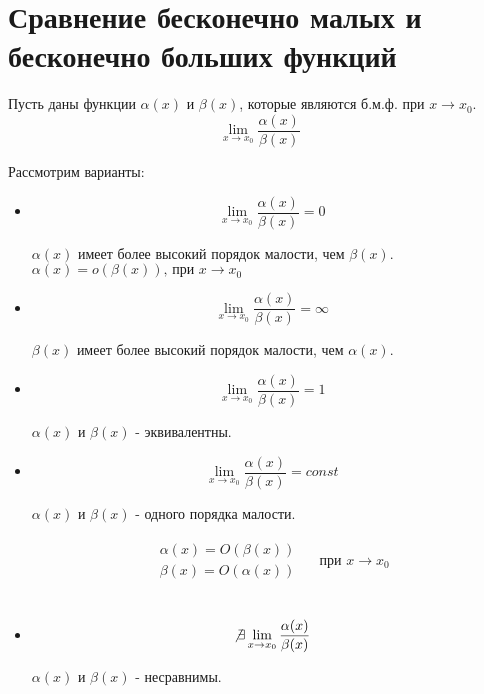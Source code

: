 \section{Сравнение бесконечно малых и бесконечно больших функций}

Пусть даны функции $\alpha(x)$ и $\beta(x)$, которые являются б.м.ф. при $x \to x_0$. \[
  \lim_{x \to x_0} \frac{\alpha(x)}{\beta(x)}
\]

Рассмотрим варианты:

\begin{itemize}

  \item \[
      \lim_{x \to x_0} \frac{\alpha(x)}{\beta(x)} = 0
  \] 
  \begin{center}
    $\alpha(x)$ имеет более высокий порядок малости, чем $\beta(x)$. \\
    $\boxed{\alpha(x) = o(\beta(x)) \text{, при } x \to x_0}$
  \end{center} 
  
  \item \[
  \lim_{x \to x_0} \frac{\alpha(x)}{\beta(x)} = \infty
  \]
  \begin{center}
    $\beta(x)$ имеет более высокий порядок малости, чем $\alpha(x)$. \\
  \end{center} 

  \item \[
    \lim_{x \to x_0} \frac{\alpha(x)}{\beta(x)} = 1
  \] 
  \begin{center}
    $\alpha(x)$ и $\beta(x)$ - эквивалентны. \\
  \end{center}

  \item \[
    \lim_{x \to x_0} \frac{\alpha(x)}{\beta(x)} = const
  \] 
  \begin{center}
    $\alpha(x)$ и $\beta(x)$ - одного порядка малости.
  \end{center}
  \begin{gather*}
    \boxed{
      \begin{matrix}
        \alpha(x) = O(\beta(x)) \\
        \beta(x) = O(\alpha(x))
      \end{matrix} \quad
      \text{ при } x \to x_0
    }
  \end{gather*}
  \\
  \item \[
  \not\exists \lim_{x \to x_0} \frac{\alpha(x)}{\beta(x)}
  \] 
  \begin{center}
    $\alpha(x)$ и $\beta(x)$ - несравнимы.
  \end{center}
\end{itemize}

